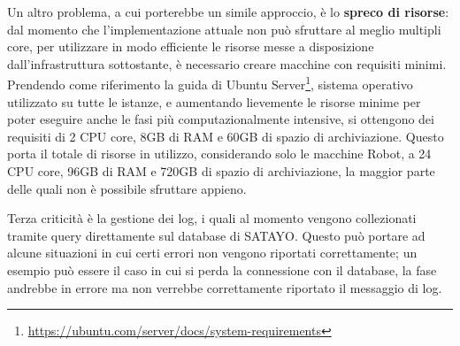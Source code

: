 Un altro problema, a cui porterebbe un simile approccio, è lo \textbf{spreco di
risorse}: dal momento che l'implementazione attuale non può sfruttare al meglio multipli
core, per utilizzare in modo efficiente le risorse messe a disposizione dall'infrastruttura
sottostante, è necessario creare macchine con requisiti minimi. Prendendo come
riferimento la guida di Ubuntu Server\footnote{\url{https://ubuntu.com/server/docs/system-requirements}},
sistema operativo utilizzato su tutte le istanze, e aumentando lievemente le risorse
minime per poter eseguire anche le fasi più computazionalmente intensive, si
ottengono dei requisiti di 2 CPU core, 8GB di RAM e 60GB di spazio di archiviazione.
Questo porta il totale di risorse in utilizzo, considerando solo le macchine Robot,
a 24 CPU core, 96GB di RAM e 720GB di spazio di archiviazione, la maggior parte
delle quali non è possibile sfruttare appieno.

Terza criticità è la gestione dei log, i quali al momento vengono collezionati tramite
query direttamente sul database di SATAYO. Questo può portare ad alcune
situazioni in cui certi errori non vengono riportati correttamente; un esempio può
essere il caso in cui si perda la connessione con il database, la fase andrebbe
in errore ma non verrebbe correttamente riportato il messaggio di log.